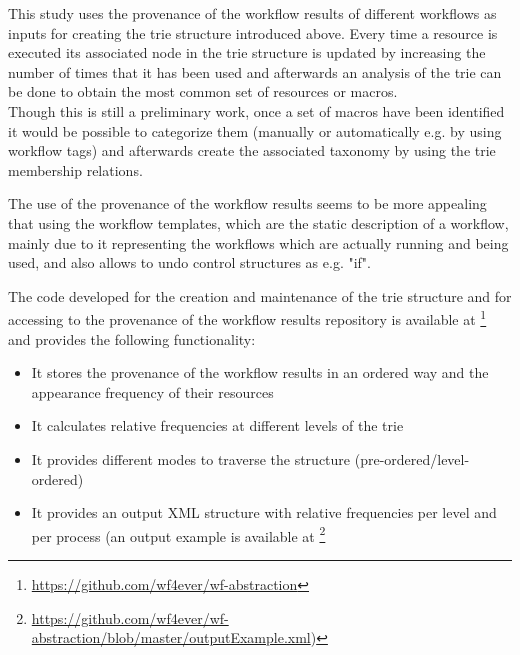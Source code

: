 This study uses the provenance of the workflow results of different workflows as inputs for creating the trie structure introduced above. Every time a resource is executed its associated node in the trie structure is updated by increasing the number of times that it has been used and afterwards an analysis of the trie can be done to obtain the most common set of resources or macros. \\
 
Though this is still a preliminary work, once a set of macros have been identified it would be possible to categorize them (manually or automatically e.g. by using workflow tags) and afterwards create the associated taxonomy by using the trie membership relations.

The use of the provenance of the workflow results seems to be more appealing that using the workflow templates, which are the static description of a workflow, mainly due to it representing the workflows which are actually running and being used, and also allows to undo control structures as e.g. "if".

The code developed for the creation and maintenance of the trie structure and for accessing to the provenance of the workflow results repository is available at \footnote{\url{https://github.com/wf4ever/wf-abstraction}} and provides the following functionality:

\begin{itemize}
\item It stores the provenance of the workflow results in an ordered way and the appearance frequency of their resources
\item It calculates relative frequencies at different levels of the trie
\item It provides different modes to traverse the structure (pre-ordered/level-ordered)
\item It provides an output XML structure with relative frequencies per level and per process (an output example is available at \footnote{\url{https://github.com/wf4ever/wf-abstraction/blob/master/outputExample.xml})}
\end{itemize}

